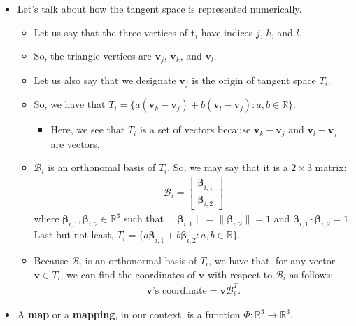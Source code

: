 \documentclass[10pt]{article}
\newcommand{\ve}[1]{\mathbf{#1}}
\newcommand{\ves}[1]{\boldsymbol{#1}}
\newcommand{\ra}{\rightarrow}
\newcommand{\mcal}[1]{\mathcal{#1}}
\newcommand{\Real}{\mathbb{R}}
\begin{document}
\begin{itemize}
    \item Let's talk about how the tangent space is represented numerically.
    \begin{itemize}
        \item Let us say that the three vertices of $\ve{t}_i$ have indices $j$, $k$, and $l$.
        \item So, the triangle vertices are $\ve{v}_j$, $\ve{v}_k$, and $\ve{v}_l$.
        \item Let us also say that we designate $\ve{v}_j$ is the origin of tangent space $T_i$.
        \item So, we have that $T_i = \{ a(\ve{v}_k - \ve{v}_j) + b(\ve{v}_l - \ve{v}_j) : a, b \in \Real \}$.
        \begin{itemize}
            \item Here, we see that $T_i$ is a set of vectors because $\ve{v}_k - \ve{v}_j$ and $\ve{v}_l - \ve{v}_j$ are vectors.            
        \end{itemize}
        \item $\mcal{B}_i$ is an orthonomal basis of $T_i$. So, we may say that it is a $2 \times 3$ matrix:
        \begin{align*}
            \mcal{B}_i = \begin{bmatrix}
                \ves{\beta}_{i,1} \\ 
                \ves{\beta}_{i,2}
            \end{bmatrix}            
        \end{align*}
        where $\ves{\beta}_{i,1}, \ves{\beta}_{i,2} \in \Real^{3}$ such that $\| \ves{\beta}_{i,1} \| = \| \ves{\beta}_{i,2} \| = 1$ and $\ves{\beta}_{i,1} \cdot \ves{\beta}_{i,2} = 1$. Last but not least, $T_i = \{ a \ves{\beta}_{i,1} + b \ves{\beta}_{i,2} : a, b \in \Real \}.$
        \item Because $\mcal{B}_i$ is an orthonormal basis of $T_i$, we have that, for any vector $\ve{v} \in T_i$, we can find the coordinates of $\ve{v}$ with respect to $\mcal{B}_i$ as follows:
        \begin{align*}
            \mbox{$\ve{v}$'s coordinate} = \ve{v} \mcal{B}_i^T.
        \end{align*}
    \end{itemize}
    
    \item A {\bf map} or a {\bf mapping}, in our context, is a function $\Phi: \Real^{3} \ra \Real^{3}$.
    

\end{itemize}
\end{document}
